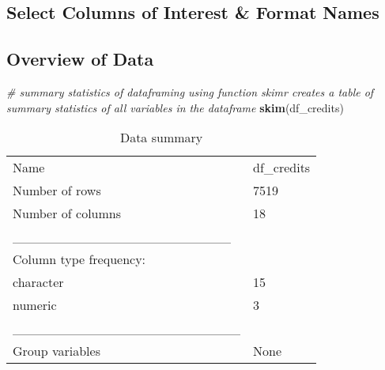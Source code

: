 \documentclass[]{article}
\newenvironment{Shaded}{\begin{snugshade}}{\end{snugshade}}
\newcommand{\CommentTok}[1]{\textcolor[rgb]{0.56,0.35,0.01}{\textit{#1}}}
\newcommand{\DecValTok}[1]{\textcolor[rgb]{0.00,0.00,0.81}{#1}}
\newcommand{\KeywordTok}[1]{\textcolor[rgb]{0.13,0.29,0.53}{\textbf{#1}}}
\newcommand{\NormalTok}[1]{#1}
\newcommand{\OperatorTok}[1]{\textcolor[rgb]{0.81,0.36,0.00}{\textbf{#1}}}
\newcommand{\StringTok}[1]{\textcolor[rgb]{0.31,0.60,0.02}{#1}}
\begin{document}
\hypertarget{select-columns-of-interest-format-names}{%
\subsection{Select Columns of Interest \& Format
Names}\label{select-columns-of-interest-format-names}}

\begin{Shaded}
\end{Shaded}

\hypertarget{overview-of-data}{%
\subsection{Overview of Data}\label{overview-of-data}}

\begin{Shaded}
\begin{Highlighting}[]
\CommentTok{# summary statistics of dataframing using function skimr creates a table of summary statistics of all variables in the dataframe}
\KeywordTok{skim}\NormalTok{(df_credits)}
\end{Highlighting}
\end{Shaded}

\begin{longtable}[]{@{}ll@{}}
\caption{Data summary}\tabularnewline
\toprule
\endhead
Name & df\_credits\tabularnewline
Number of rows & 7519\tabularnewline
Number of columns & 18\tabularnewline
\_\_\_\_\_\_\_\_\_\_\_\_\_\_\_\_\_\_\_\_\_\_\_ &\tabularnewline
Column type frequency: &\tabularnewline
character & 15\tabularnewline
numeric & 3\tabularnewline
\_\_\_\_\_\_\_\_\_\_\_\_\_\_\_\_\_\_\_\_\_\_\_\_ &\tabularnewline
Group variables & None\tabularnewline
\bottomrule
\end{longtable}
\end{document}
